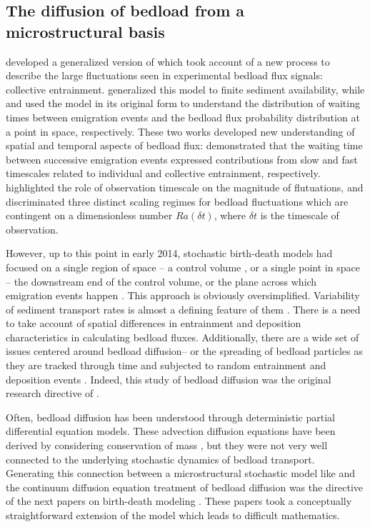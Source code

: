 
\subsection{The diffusion of bedload from a microstructural basis}


\citet{Ancey2008} developed a generalized version of \citet{Einstein1950} which took account of a new process to describe the large fluctuations seen in experimental bedload flux signals: collective entrainment. 
\citet{Turowski2009} generalized this model to finite sediment availability, while \citet{Heyman2013} and \citet{Ma2014} used the \citet{Ancey2008} model in its original form to understand the distribution of waiting times between emigration events and the bedload flux probability distribution at a point in space, respectively. 
These two works developed new understanding of spatial and temporal aspects of bedload flux: \citet{Heyman2013} demonstrated that the waiting time between successive emigration events expressed contributions from slow and fast timescales related to individual and collective entrainment, respectively. 
\citet{Ma2014} highlighted the role of observation timescale on the magnitude of flutuations, and discriminated three distinct scaling regimes for bedload fluctuations which are contingent on a dimensionless number $Ra(\delta t)$, where $\delta t$ is the timescale of observation. 

However, up to this point in early 2014, stochastic birth-death models had focused on a single region of space -- a control volume \citep{Einstein1950, Ancey2006, Ancey2008}, or a single point in space -- the downstream end of the control volume, or the plane across which emigration events happen \citep{Heyman2013, Ma2014b}.
This approach is obviously oversimplified. Variability of sediment transport rates is almost a defining feature of them \citep{Hassan2008, Venditti2016, Nelson2014}. 
There is a need to take account of spatial differences in entrainment and deposition characteristics in calculating bedload fluxes. 
Additionally, there are a wide set of issues centered around bedload diffusion-- or the spreading of bedload particles as they are tracked through time and subjected to random entrainment and deposition events \citep{Hassan2016}. Indeed, this study of bedload diffusion was the original research directive of \citet{Einstein1937}. 

Often, bedload diffusion has been understood through deterministic partial differential equation models. These advection diffusion equations have been derived by considering conservation of mass \citep{}, but they were not very well connected to the underlying stochastic dynamics of bedload transport. 
Generating this connection between a microstructural stochastic model like \citet{Ancey2008} and the continuum diffusion equation treatment of bedload diffusion \citep[e.g.][]{Parker2002} was the directive of the next papers on birth-death modeling \citep{Ancey2014,Ancey2015}. 
These papers took a conceptually straightforward extension of the \citet{Ancey2008} model which leads to difficult mathematics. 

